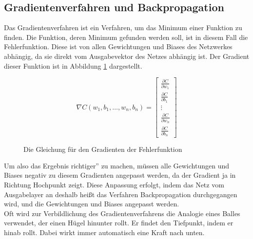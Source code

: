 \documentclass[11pt]{article}
\begin{document}
\subsection{Gradientenverfahren und Backpropagation}
\label{Gradient_section}
Das Gradientenverfahren ist ein Verfahren, um das Minimum einer Funktion zu finden. Die Funktion, deren Minimum gefunden werden soll, ist in diesem Fall die Fehlerfunktion. Diese ist von allen Gewichtungen und Biases des Netzwerkes abhängig, da sie direkt vom Ausgabevektor des Netzes abhängig ist. Der Gradient dieser Funktion ist in Abbildung \ref{Gradient_Function} dargestellt.
\begin{figure}[h]
	\begin{equation*}
	\nabla C(w_1,b_1,\ldots,w_n,b_n)=
	\begin{bmatrix}
		\frac{\partial C}{\partial w_1}\\
		\frac{\partial C}{\partial b_1}\\
		\vdots\\
		\frac{\partial C}{\partial w_n}\\
		\frac{\partial C}{\partial b_n}
	\end{bmatrix}
	\end{equation*}
	\caption{Die Gleichung für den Gradienten der Fehlerfunktion}
	\label{Gradient_Function}
\end{figure}
\newline
Um also das Ergebnis \glqq richtiger'' zu machen, müssen alle Gewichtungen und Biases negativ zu diesem Gradienten angepasst werden, da der Gradient ja in Richtung Hochpunkt zeigt. Diese Anpassung erfolgt, indem das Netz vom Ausgabelayer an deshalb heißt das Verfahren Backpropagation durchgegangen wird, und die Gewichtungen und Biases angepasst werden.\\
Oft wird zur Verbildlichung des Gradientenverfahrens die Analogie eines Balles verwendet, der einen Hügel hinunter rollt. Er findet den Tiefpunkt, indem er hinab rollt. Dabei wirkt immer automatisch eine Kraft nach unten.
\end{document}
